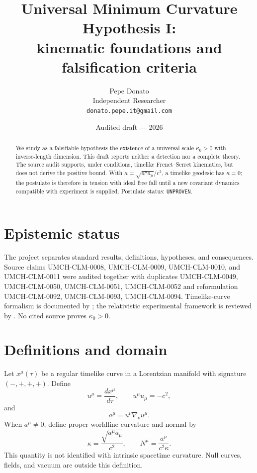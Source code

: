 \documentclass[11pt,a4paper]{article}
\title{Universal Minimum Curvature Hypothesis I:\\kinematic foundations and falsification criteria}
\author{Pepe Donato\\Independent Researcher\\\texttt{donato.pepe.it@gmail.com}}
\date{Audited draft --- 2026}
\begin{document}
\maketitle

\begin{abstract}
We study as a falsifiable hypothesis the existence of a universal scale $\kappa_0>0$ with inverse-length dimension. This draft reports neither a detection nor a complete theory. The source audit supports, under conditions, timelike Frenet--Serret kinematics, but does not derive the positive bound. With $\kappa=\sqrt{a^\mu a_\mu}/c^2$, a timelike geodesic has $\kappa=0$; the postulate is therefore in tension with ideal free fall until a new covariant dynamics compatible with experiment is supplied. Postulate status: \texttt{UNPROVEN}.
\end{abstract}

\section{Epistemic status}\label{sec:status}
The project separates standard results, definitions, hypotheses, and consequences. Source claims UMCH-CLM-0008, UMCH-CLM-0009, UMCH-CLM-0010, and UMCH-CLM-0011 were audited together with duplicates UMCH-CLM-0049, UMCH-CLM-0050, UMCH-CLM-0051, UMCH-CLM-0052 and reformulation UMCH-CLM-0092, UMCH-CLM-0093, UMCH-CLM-0094. Timelike-curve formalism is documented by \cite{FormigaRomero2006}; the relativistic experimental framework is reviewed by \cite{Will2014}. No cited source proves $\kappa_0>0$.

\section{Definitions and domain}\label{sec:definitions}
Let $x^\mu(\tau)$ be a regular timelike curve in a Lorentzian manifold with signature $(-,+,+,+)$. Define
\begin{equation}\label{eq:velocity}
u^\mu=\frac{dx^\mu}{d\tau},\qquad u^\mu u_\mu=-c^2,
\end{equation}
and
\begin{equation}\label{eq:acceleration}
a^\mu=u^\nu\nabla_\nu u^\mu.
\end{equation}
When $a^\mu\ne0$, define proper worldline curvature and normal by
\begin{equation}\label{eq:curvature}
\kappa=\frac{\sqrt{a^\mu a_\mu}}{c^2},\qquad N^\mu=\frac{a^\mu}{c^2\kappa}.
\end{equation}
This quantity is not identified with intrinsic spacetime curvature. Null curves, fields, and vacuum are outside this definition.
\end{document}
